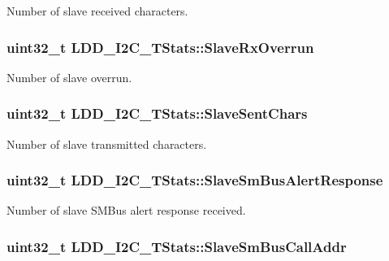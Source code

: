 Number of slave received characters. \hypertarget{struct_l_d_d___i2_c___t_stats_afe6c0b4f10465050a22af12bb0d8cd00}{
\subsubsection[{Slave\-Rx\-Overrun}]{\setlength{\rightskip}{0pt plus 5cm}uint32\-\_\-t L\-D\-D\-\_\-\-I2\-C\-\_\-\-T\-Stats\-::\-Slave\-Rx\-Overrun}}\label{struct_l_d_d___i2_c___t_stats_afe6c0b4f10465050a22af12bb0d8cd00}
Number of slave overrun. \hypertarget{struct_l_d_d___i2_c___t_stats_ad4935dd9ff320dcc83fe33f388713c85}{
\subsubsection[{Slave\-Sent\-Chars}]{\setlength{\rightskip}{0pt plus 5cm}uint32\-\_\-t L\-D\-D\-\_\-\-I2\-C\-\_\-\-T\-Stats\-::\-Slave\-Sent\-Chars}}\label{struct_l_d_d___i2_c___t_stats_ad4935dd9ff320dcc83fe33f388713c85}
Number of slave transmitted characters. \hypertarget{struct_l_d_d___i2_c___t_stats_a8013f91bdae1fc4fddf111aa1e2a52ca}{
\subsubsection[{Slave\-Sm\-Bus\-Alert\-Response}]{\setlength{\rightskip}{0pt plus 5cm}uint32\-\_\-t L\-D\-D\-\_\-\-I2\-C\-\_\-\-T\-Stats\-::\-Slave\-Sm\-Bus\-Alert\-Response}}\label{struct_l_d_d___i2_c___t_stats_a8013f91bdae1fc4fddf111aa1e2a52ca}
Number of slave S\-M\-Bus alert response received. \hypertarget{struct_l_d_d___i2_c___t_stats_a134cb9fb9e37217e70e8a93924bca300}{
\subsubsection[{Slave\-Sm\-Bus\-Call\-Addr}]{\setlength{\rightskip}{0pt plus 5cm}uint32\-\_\-t L\-D\-D\-\_\-\-I2\-C\-\_\-\-T\-Stats\-::\-Slave\-Sm\-Bus\-Call\-Addr}}\label{struct_l_d_d___i2_c___t_stats_a134cb9fb9e37217e70e8a93924bca300}

